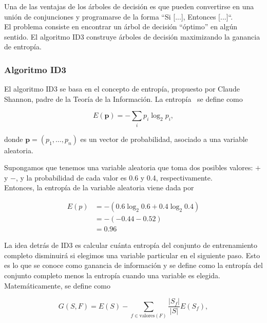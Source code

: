 Una de las ventajas de los árboles de decisión es que pueden convertirse en una unión de conjunciones y programarse de la forma ``Si [...], Entonces [...]``.\\

El problema consiste en encontrar un árbol de decisión ``óptimo'' en algún sentido. El algoritmo ID3 construye árboles de decisión maximizando la ganancia de entropía.

\subsubsection{Algoritmo ID3}

El algoritmo ID3 se basa en el concepto de entropía, propuesto por Claude Shannon, padre de la Teoría de la Información. La entropía~\cite{Shannon:2001:MTC:584091.584093} se define como

\begin{equation}
E(\mathbf{p}) = -\sum_{i} p_i \log_2 p_i,
\end{equation}

donde $\mathbf{p} = (p_1, \dots, p_n)$ es un vector de probabilidad, asociado a una variable aleatoria.

\begin{ejemplo}
Supongamos que tenemos una variable aleatoria que toma dos posibles valores: $+$ y $-$, y la probabilidad de cada valor es 0.6 y 0.4, respectivamente.\\

Entonces, la entropía de la variable aleatoria viene dada por

\begin{align}
E(p) & = - (0.6 \log_2 0.6 + 0.4 \log_2 0.4) \\
     & = -(-0.44 - 0.52)\\
     & = 0.96
\end{align}
\end{ejemplo}

La idea detrás de ID3 es calcular cuánta entropía del conjunto de entrenamiento completo disminuirá si elegimos una variable particular en el siguiente paso. Esto es lo que se conoce como ganancia de información y se define como la entropía del conjunto completo menos la entropía cuando una variable es elegida. Matemáticamente, se define como

\begin{equation}
G(S, F) = E(S) - \sum_{f \in \text{valores}(F)} \dfrac{|S_f|}{|S|} E(S_f),
\end{equation}

